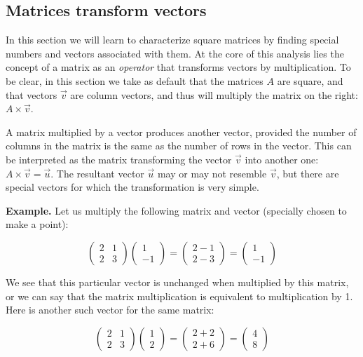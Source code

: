 \documentclass[
  letterpaper,
  DIV=11,
  numbers=noendperiod]{scrreprt}
\begin{document}
\hypertarget{matrices-transform-vectors}{%
\subsection{Matrices transform
vectors}\label{matrices-transform-vectors}}

In this section we will learn to characterize square matrices by finding
special numbers and vectors associated with them. At the core of this
analysis lies the concept of a matrix as an \emph{operator} that
transforms vectors by multiplication. To be clear, in this section we
take as default that the matrices \(A\) are square, and that vectors
\(\vec v\) are column vectors, and thus will multiply the matrix on the
right: \(A \times \vec v\).

A matrix multiplied by a vector produces another vector, provided the
number of columns in the matrix is the same as the number of rows in the
vector. This can be interpreted as the matrix transforming the vector
\(\vec v\) into another one: \(A \times \vec v = \vec u\). The resultant
vector \(\vec u\) may or may not resemble \(\vec v\), but there are
special vectors for which the transformation is very simple.

\textbf{Example.} Let us multiply the following matrix and vector
(specially chosen to make a point):

\[
\left(\begin{array}{cc}2 & 1 \\ 2& 3\end{array}\right)\left(\begin{array}{c}1 \\ -1 \end{array}\right) = \left(\begin{array}{c}2 -1 \\ 2 - 3 \end{array}\right) =  \left(\begin{array}{c} 1 \\ -1 \end{array}\right)
\]

We see that this particular vector is unchanged when multiplied by this
matrix, or we can say that the matrix multiplication is equivalent to
multiplication by 1. Here is another such vector for the same matrix:

\[
\left(\begin{array}{cc}2 & 1 \\ 2& 3\end{array}\right)\left(\begin{array}{c}1 \\ 2 \end{array}\right) = \left(\begin{array}{c}2 +2 \\ 2 + 6 \end{array}\right) =  \left(\begin{array}{c} 4 \\ 8 \end{array}\right)
\]
\end{document}
